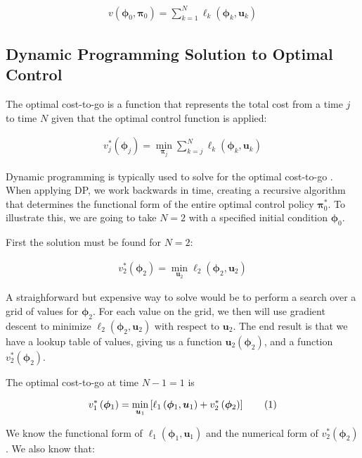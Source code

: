 \documentclass{article} %
\newcommand\numberthis{\addtocounter{equation}{1}\tag{\theequation}}
\begin{document}
\begin{align*}
v\left( \bm{\phi}_0, \bm{\pi}_0 \right) = \sum_{k=1}^N \ell_k \left( \bm{\phi}_{k}, \bm{u}_k \right)
\end{align*}


\subsection{Dynamic Programming Solution to Optimal Control}

The optimal cost-to-go is a function that represents the total cost from a time
$j$ to time $N$ given that the optimal control function is applied:

\begin{align*}
v^*_j \left( \bm{\phi}_j \right) = \min_{\bm{\pi}_j} \sum_{k=j}^N \ell_k \left( \bm{\phi}_k, \bm{u}_k \right)
\end{align*}

Dynamic programming is typically used to solve for the optimal cost-to-go \cite{Bertsekas2000}. When applying
DP, we work backwards in time, creating a recursive algorithm that determines the
functional form of the entire optimal control policy $\bm{\pi}_0^*$. To illustrate
this, we are going to take $N=2$ with a specified initial condition $\bm{\phi}_0$.

First the solution must be found for $N=2$:

\begin{align*}
v^*_2 \left( \bm{\phi}_2 \right) = \min_{\bm{u}_2} \ell_2 \left( \bm{\phi}_2, \bm{u}_2 \right)
\end{align*}

A straighforward but expensive way to solve would be to perform a search over a
grid of values for $\bm{\phi}_2$. For each value on the grid, we then will use
gradient descent to minimize $\ell_2 \left( \bm{\phi}_2, \bm{u}_2 \right)$ with
respect to $\bm{u}_2$. The end result is that we have a lookup table of values,
giving us a function $\bm{u}_2(\bm{\phi}_2)$, and a function
$v^*_2 \left( \bm{\phi}_2 \right)$.

The optimal cost-to-go at time $N-1=1$ is

\begin{align*}
v^*_{1} \left( \bm{\phi}_{1} \right) = \min_{\bm{u}_{1}} \left[ \ell_1 \left( \bm{\phi}_{1}, \bm{u}_{1} \right) + v^*_2 \left( \bm{\phi}_2 \right) \right]  \numberthis \label{eq_dp} 
\end{align*}

We know the functional form of $\ell_1 \left( \bm{\phi}_{1}, \bm{u}_{1} \right)$ and the
numerical form of $v^*_2 \left( \bm{\phi}_2 \right)$. We also know that:
\end{document}
